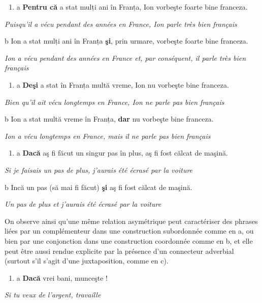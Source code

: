 \begin{enumerate}
\item \label{bkm:Ref300867086}a  \textbf{Pentru că} a stat mulți ani în Franța, Ion vorbeşte foarte bine franceza.


\end{enumerate}
{\itshape
Puisqu'il a vécu pendant des années en France, Ion parle très bien français}

  b  Ion a stat mulți ani în Franța \textbf{şi}, prin urmare, vorbeşte foarte bine franceza. 

{\itshape
Ion a vécu pendant des années en France et, par conséquent, il parle très bien français}


\begin{enumerate}
\item \label{bkm:Ref300867524}a  \textbf{Deşi} a stat în Franța multă vreme, Ion nu vorbeşte bine franceza.


\end{enumerate}
{\itshape
Bien qu'il ait vécu longtemps en France, Ion ne parle pas bien français}

  b  Ion a stat multă vreme în Franța, \textbf{dar} nu vorbeşte bine franceza. 

{\itshape
Ion a vécu longtemps en France, mais il ne parle pas bien français}


\begin{enumerate}
\item \label{bkm:Ref300867825}a  \textbf{Dacă} aş fi făcut un singur pas în plus, aş fi fost călcat de maşină.


\end{enumerate}
{\itshape
Si je faisais un pas de plus, j'aurais été écrasé par la voiture}

  b  Incă un pas (să mai fi făcut) \textbf{şi} aş fi fost călcat de maşină.

{\itshape
Un pas de plus et j'aurais été écrasé par la voiture}

On observe ainsi qu'une même relation asymétrique peut caractériser des phrases liées par un complémenteur dans une construction subordonnée comme en a, ou bien par une conjonction dans une construction coordonnée comme en b, et elle peut être aussi rendue explicite par la présence d'un connecteur adverbial (surtout s'il s'agit d'une juxtaposition, comme en c).


\begin{enumerate}
\item \label{bkm:Ref273392060}a  \textbf{Dacă} vrei bani, munceşte ! 


\end{enumerate}
{\itshape
Si tu veux de l'argent, travaille}

